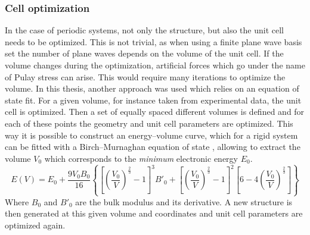 \subsubsection*{Cell optimization}
In the case of periodic systems, not only the structure, but also the unit cell needs to be optimized. This is not trivial, as when using a finite plane wave basis set the number of plane waves depends on the volume of the unit cell. If the volume changes during the optimization, artificial forces which go under the name of Pulay stress can arise. This would require many iterations to optimize the volume. In this thesis, another approach was used \cite{Vanpoucke2015} which relies on an equation of state fit. For a given volume, for instance taken from experimental data, the unit cell is optimized. Then a set of equally spaced different volumes is defined and for each of these points the geometry and unit cell parameters are optimized. This way it is possible to construct an energy--volume curve, which for a rigid system can be fitted with a Birch--Murnaghan equation of state \cite{birch1947finite,murnaghan1944compressibility}, allowing to extract the volume $V_0$ which corresponds to the \textit{minimum} electronic energy $E_{0}$. 
\[
E(V) = E_{0} + 
\dfrac{9V_{0}B_{0}}{16}
\left\lbrace 
\left[\left(\dfrac{V_{0}}{V}\right)^{\frac{2}{3}} - 1\right]^{3} B'_{0} +
\left[\left(\dfrac{V_{0}}{V}\right)^{\frac{2}{3}} - 1\right]^{2}
\left[6 - 4\left(\dfrac{V_{0}}{V}\right)^{\frac{2}{3}}\right]
\right\rbrace
\]
Where $B_0$ and $B'_{0}$ are the bulk modulus and its derivative. A new structure is then generated at this given volume and coordinates and unit cell parameters are optimized again.

